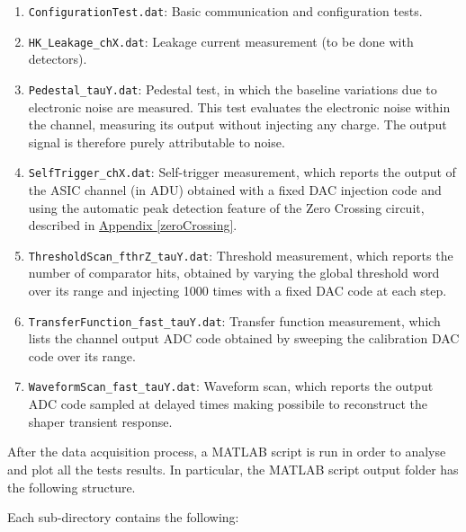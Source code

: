 \begin{enumerate}
    \itemsep0em 
    \item \texttt{ConfigurationTest.dat}: Basic communication and configuration tests.
    \item \texttt{HK\_Leakage\_chX.dat}: Leakage current measurement (to be done with detectors).
    \item \texttt{Pedestal\_tauY.dat}: Pedestal test, in which the baseline variations due to electronic noise are measured. This test evaluates the electronic noise within the channel, measuring its output without injecting any charge. The output signal is therefore purely attributable to noise.
    \item \texttt{SelfTrigger\_chX.dat}: Self-trigger measurement, which reports the output of the ASIC channel (in ADU) obtained with a fixed DAC injection code and using the automatic peak detection feature of the Zero Crossing circuit, described in \hyperref[zeroCrossing]{Appendix \ref{zeroCrossing}}.
    \item \texttt{ThresholdScan\_fthrZ\_tauY.dat}: Threshold measurement, which reports the number of comparator hits, obtained by varying the global threshold word over its range and injecting 1000 times with a fixed DAC code at each step.
    \item \texttt{TransferFunction\_fast\_tauY.dat}: Transfer function measurement, which lists the channel output ADC code obtained by sweeping the calibration DAC code over its range.
    \item \texttt{WaveformScan\_fast\_tauY.dat}: Waveform scan, which reports the output ADC code sampled at delayed times making possibile to reconstruct the shaper transient response.
\end{enumerate}

\noindent
After the data acquisition process, a MATLAB script is run in order to analyse and plot all the tests results. In particular, the MATLAB script output folder has the following structure.\\

\vspace{-0.1cm}

\vspace{0.5cm}
\noindent
Each sub-directory contains the following:

